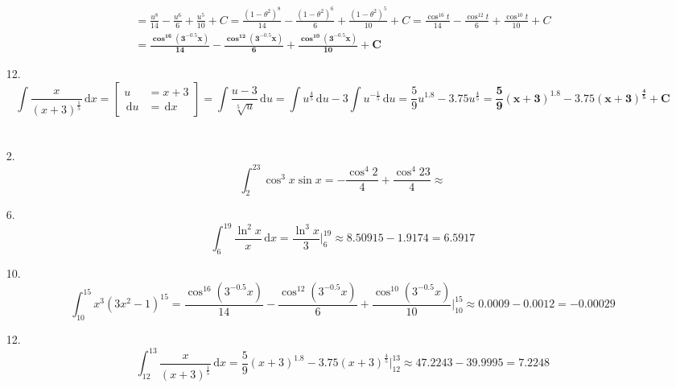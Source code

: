 \documentclass[]{article}
\newcommand\sinx  {\sin x}
\newcommand\dx    {\,\mathrm{d}x}
\newcommand\du    {\,\mathrm{d}u}
\newcommand\pus[2]{\csb{\begin{aligned}
			u &= #1 \\
			\du &= #2
\end{aligned}}}
\newcommand\ta    {\theta}
\newcommand\cl [1]    {\left ( #1 \right )}
\newcommand\csb[1]    {\left [ #1 \right ]}
\begin{document}
\begin{enumerate}
\begin{multline*}
				= \frac{u^8}{14} - \frac{u^6}{6} + \frac{u^5}{10} + C = \frac{(1 - \ta^2)^8}{14} - \frac{(1 - \ta^2)^6}{6} + \frac{(1 - \ta^2)^5}{10} + C = \frac{\cos^{16}t}{14} - \frac{\cos^{12}t}{6} + \frac{\cos^{10}t}{10} +C \\
				= \bm{\frac{\cos^{16}\cl{3^{-0.5}x}}{14} - \frac{\cos^{12}\cl{3^{-0.5}x}}{6} + \frac{\cos^{10}\cl{3^{-0.5}x}}{10} + C}
			\end{multline*}
		\item[12.]
			\[ \int \frac{x}{(x + 3)^{\frac{1}{5}}}\dx = \pus{x + 3}{\dx} = \int \frac{u - 3}{\sqrt[5]{u}}\du = \int u^{\frac{4}{5}}\du - 3\int u^{-\frac{1}{5}}\du = \frac{5}{9}u^{1.8} - 3.75u^{\frac{4}{5}} = \bm{\frac{5}{9}(x + 3)^{1.8} - 3.75(x + 3)^{\frac{4}{5}} + C} \]
	\end{enumerate}
	\section{}
	\begin{enumerate}
		\item[2.]
		\[ \int_2^{23} \cos^3x \sinx = -\frac{\cos^4 2}{4} + \frac{\cos^4 23}{4} \approx  \]
		\item[6.]
		\[ \int_6^{19} \frac{\ln^2x}{x} \dx = \frac{\ln^3x}{3} \Bigg\lvert^{19}_{6} \approx 8.50915 - 1.9174 = 6.5917 \]
		\item[10.]
		\[ \int_{10}^{15} x^3(3x^2 - 1)^{15} = \frac{\cos^{16}\cl{3^{-0.5}x}}{14} - \frac{\cos^{12}\cl{3^{-0.5}x}}{6} + \frac{\cos^{10}\cl{3^{-0.5}x}}{10} \Bigg\lvert^{15}_{10} \approx 0.0009 - 0.0012 = -0.00029 \]
		\item[12.]
		\[ \int_{12}^{13} \frac{x}{(x + 3)^{\frac{1}{5}}}\dx = \frac{5}{9}(x + 3)^{1.8} - 3.75(x + 3)^{\frac{4}{5}} \Bigg\lvert_{12}^{13} \approx 47.2243 - 39.9995 = 7.2248 \]
	\end{enumerate}
\end{document}
